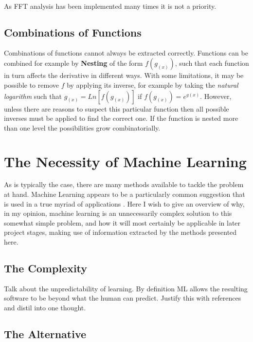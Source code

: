 \documentclass[main.tex]{subfiles}
\begin{document}
      As FFT analysis has been implemented many times it is not a priority.
    
    \subsection{Combinations of Functions}
    \label{sec:back:combFunc}
    
      Combinations of functions cannot always be extracted correctly. Functions can be combined for example by \textbf{Nesting} of the form $f(g_{(x)})$, such that each function in turn affects the derivative in different ways. With some limitations, it may be possible to remove $f$ by applying its inverse, for example by taking the \textit{natural logarithm} such that $g_{(x)}=Ln\left [ f(g_{(x)})\right ]$ if $f(g_{(x)}) = e^{g(x)}$. However, unless there are reasons to suspect this particular function then all possible inverses must be applied to find the correct one. If the function is nested more than one level the possibilities grow combinatorially. 
      
      
  \section{The Necessity of Machine Learning}
  
    As is typically the case, there are many methods available to tackle the problem at hand. Machine Learning appears to be a particularly common suggestion that is used in a true myriad of applications \cite{}. Here I wish to give an overview of why, in my opinion, machine learning is an unnecessarily complex solution to this somewhat simple problem, and how it will most certainly be applicable in later project stages, making use of information extracted by the methods presented here.
    
    \subsection{The Complexity}
    
      Talk about the unpredictability of learning. By definition ML allows the resulting software to be beyond what the human can predict. Justify this with references and distil into one thought.
    
    \subsection{The Alternative}
    
\end{document}
